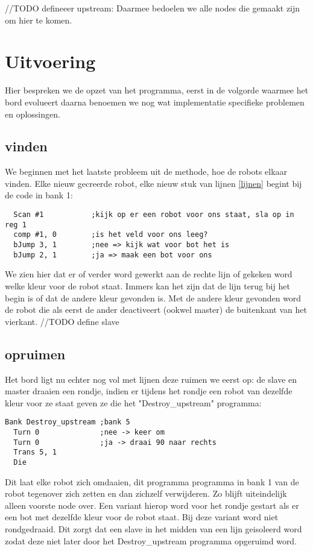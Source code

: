 \documentclass[10pt]{article}
\begin{document}
//TODO defineeer upstream: Daarmee bedoelen we alle nodes die gemaakt zijn om hier te komen.  


\section{Uitvoering}

Hier bespreken we de opzet van het programma, eerst in de volgorde waarmee het bord evolueert daarna benoemen we nog wat implementatie specifieke problemen en oplossingen.

\subsection{vinden}
We beginnen met het laatste probleem uit de methode, hoe de robots elkaar vinden. Elke nieuw gecreerde robot, elke nieuw stuk van lijnen \ref{lijnen} begint bij de code in bank 1:

\begin{verbatim}
  Scan #1           ;kijk op er een robot voor ons staat, sla op in reg 1
  comp #1, 0        ;is het veld voor ons leeg?
  bJump 3, 1        ;nee => kijk wat voor bot het is
  bJump 2, 1        ;ja => maak een bot voor ons
\end{verbatim}

We zien hier dat er of verder word gewerkt aan de rechte lijn of gekeken word welke kleur voor de robot staat. Immers kan het zijn dat de lijn terug bij het begin is of dat de andere kleur gevonden is. Met de andere kleur gevonden word de robot die als eerst de ander deactiveert (ookwel master) de buitenkant van het vierkant. //TODO define slave

\subsection{opruimen}
Het bord ligt nu echter nog vol met lijnen deze ruimen we eerst op: de slave en master draaien een rondje, indien er tijdens het rondje een robot van dezelfde kleur voor ze staat geven ze die het "Destroy\_upstream" programma:

\begin{verbatim}
Bank Destroy_upstream ;bank 5
  Turn 0              ;nee -> keer om
  Turn 0              ;ja -> draai 90 naar rechts
  Trans 5, 1
  Die
\end{verbatim}

Dit laat elke robot zich omdaaien, dit programma programma in bank 1 van de robot tegenover zich zetten en dan zichzelf verwijderen. Zo blijft uiteindelijk alleen voorste node over. Een variant hierop word voor het rondje gestart als er een bot met dezelfde kleur voor de robot staat. Bij deze variant word niet rondgedraaid. Dit zorgt dat een slave in het midden van een lijn geisoleerd word zodat deze niet later door het Destroy\_upstream programma opgeruimd word.
\end{document}
